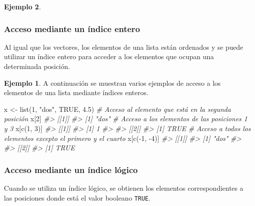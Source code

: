 \documentclass[
]{book}
\newenvironment{Shaded}{\begin{snugshade}}{\end{snugshade}}
\newcommand{\CommentTok}[1]{\textcolor[rgb]{0.56,0.35,0.01}{\textit{#1}}}
\newcommand{\ConstantTok}[1]{\textcolor[rgb]{0.00,0.00,0.00}{#1}}
\newcommand{\DecValTok}[1]{\textcolor[rgb]{0.00,0.00,0.81}{#1}}
\newcommand{\FloatTok}[1]{\textcolor[rgb]{0.00,0.00,0.81}{#1}}
\newcommand{\FunctionTok}[1]{\textcolor[rgb]{0.00,0.00,0.00}{#1}}
\newcommand{\NormalTok}[1]{#1}
\newcommand{\OtherTok}[1]{\textcolor[rgb]{0.56,0.35,0.01}{#1}}
\newcommand{\SpecialCharTok}[1]{\textcolor[rgb]{0.00,0.00,0.00}{#1}}
\newcommand{\StringTok}[1]{\textcolor[rgb]{0.31,0.60,0.02}{#1}}
\theoremstyle{definition}
\theoremstyle{definition}
\newtheorem{example}{Ejemplo}[chapter]
\theoremstyle{definition}
\theoremstyle{definition}
\theoremstyle{remark}
\begin{document}
\begin{example}
{\subsubsection{Acceso mediante un índice entero}\label{acceso-mediante-un-uxedndice-entero-1}}

Al igual que los vectores, los elementos de una lista están ordenados y se puede utilizar un índice entero para acceder a los elementos que ocupan una determinada posición.

\begin{example}

A continuación se muestran varios ejemplos de acceso a los elementos de una lista mediante índices enteros.

\begin{Shaded}
\begin{Highlighting}[]
\NormalTok{x }\OtherTok{\textless{}{-}} \FunctionTok{list}\NormalTok{(}\DecValTok{1}\NormalTok{, }\StringTok{"dos"}\NormalTok{, }\ConstantTok{TRUE}\NormalTok{, }\FloatTok{4.5}\NormalTok{)}
\CommentTok{\# Acceso al elemento que está en la segunda posición}
\NormalTok{x[}\DecValTok{2}\NormalTok{]}
\CommentTok{\#\textgreater{} [[1]]}
\CommentTok{\#\textgreater{} [1] "dos"}
\CommentTok{\# Acceso a los elementos de las posiciones 1 y 3}
\NormalTok{x[}\FunctionTok{c}\NormalTok{(}\DecValTok{1}\NormalTok{, }\DecValTok{3}\NormalTok{)]}
\CommentTok{\#\textgreater{} [[1]]}
\CommentTok{\#\textgreater{} [1] 1}
\CommentTok{\#\textgreater{} }
\CommentTok{\#\textgreater{} [[2]]}
\CommentTok{\#\textgreater{} [1] TRUE}
\CommentTok{\# Acceso a todos los elementos excepto el primero y el cuarto}
\NormalTok{x[}\FunctionTok{c}\NormalTok{(}\SpecialCharTok{{-}}\DecValTok{1}\NormalTok{, }\SpecialCharTok{{-}}\DecValTok{4}\NormalTok{)]}
\CommentTok{\#\textgreater{} [[1]]}
\CommentTok{\#\textgreater{} [1] "dos"}
\CommentTok{\#\textgreater{} }
\CommentTok{\#\textgreater{} [[2]]}
\CommentTok{\#\textgreater{} [1] TRUE}
\end{Highlighting}
\end{Shaded}

\end{example}

\hypertarget{acceso-mediante-un-uxedndice-luxf3gico-1}{%
\subsubsection{Acceso mediante un índice lógico}\label{acceso-mediante-un-uxedndice-luxf3gico-1}}

Cuando se utiliza un índice lógico, se obtienen los elementos correspondientes a las posiciones donde está el valor booleano \texttt{TRUE}.


\end{example}
\end{document}
